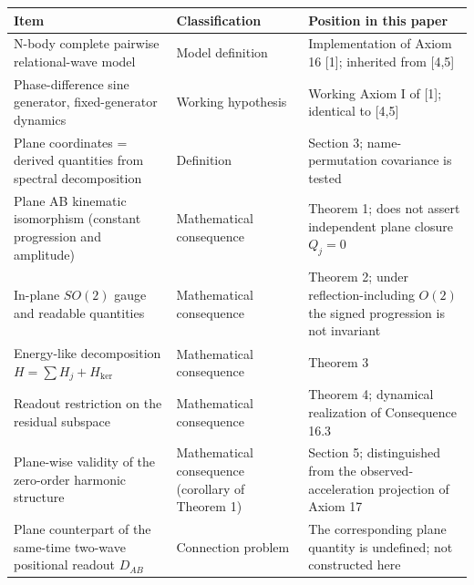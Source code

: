 \documentclass[
  a4paper,
]{article}
\newcounter{none} %
\begin{document}
{\def\LTcaptype{none} %
\begin{longtable}[]{@{}
  >{\raggedright\arraybackslash}p{}
  >{\raggedright\arraybackslash}p{}
  >{\raggedright\arraybackslash}p{}@{}}
\toprule\noalign{}
\begin{minipage}[b]{\linewidth}\raggedright
Item
\end{minipage} & \begin{minipage}[b]{\linewidth}\raggedright
Classification
\end{minipage} & \begin{minipage}[b]{\linewidth}\raggedright
Position in this paper
\end{minipage} \\
\midrule\noalign{}
\endhead
\bottomrule\noalign{}
\endlastfoot
N-body complete pairwise relational-wave model & Model definition &
Implementation of Axiom 16 {[}1{]}; inherited from {[}4,5{]} \\
Phase-difference sine generator, fixed-generator dynamics & Working
hypothesis & Working Axiom I of {[}1{]}; identical to {[}4,5{]} \\
Plane coordinates = derived quantities from spectral decomposition &
Definition & Section 3; name-permutation covariance is tested \\
Plane AB kinematic isomorphism (constant progression and amplitude) &
Mathematical consequence & Theorem 1; does not assert independent plane
closure \(Q_j=0\) \\
In-plane \(SO(2)\) gauge and readable quantities & Mathematical
consequence & Theorem 2; under reflection-including \(O(2)\) the signed
progression is not invariant \\
Energy-like decomposition \(H=\sum H_j+H_{\ker}\) & Mathematical
consequence & Theorem 3 \\
Readout restriction on the residual subspace & Mathematical consequence
& Theorem 4; dynamical realization of Consequence 16.3 \\
Plane-wise validity of the zero-order harmonic structure & Mathematical
consequence (corollary of Theorem 1) & Section 5; distinguished from the
observed-acceleration projection of Axiom 17 \\
Plane counterpart of the same-time two-wave positional readout
\(D_{AB}\) & Connection problem & The corresponding plane quantity is
undefined; not constructed here \\

\end{longtable}}
\end{document}
